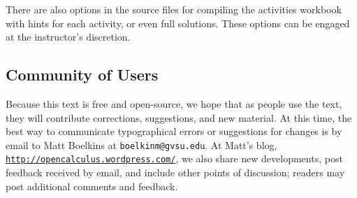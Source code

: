 There are also options in the source files for compiling the activities workbook with hints for each activity, or even full solutions.  These options can be engaged at the instructor's discretion.



\subsection*{Community of Users}

Because this text is free and open-source, we hope that as people use the text, they will contribute corrections, suggestions, and new material.  At this time, the best way to communicate typographical errors or suggestions for changes is by email to Matt Boelkins at \texttt{boelkinm@gvsu.edu}.  At Matt's blog, \href{http://opencalculus.wordpress.com/}{\texttt{http://opencalculus.wordpress.com/}}, we also share new developments, post feedback received by email, and include other points of discussion; readers may post additional comments and feedback.





